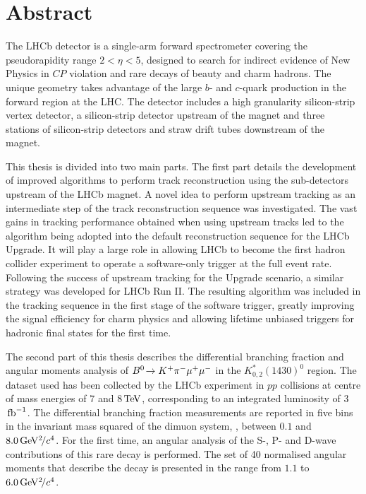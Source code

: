 \section*{Abstract}

The LHCb detector is a single-arm forward spectrometer covering the pseudorapidity range $2 < \eta < 5$, designed to search for indirect evidence of New Physics in $C\!P$ violation and rare decays of beauty and charm hadrons. The unique geometry takes advantage of the large $b$- and $c$-quark production in the forward region at the LHC. The detector includes a high granularity silicon-strip vertex detector, a silicon-strip detector upstream of the magnet and three stations of silicon-strip detectors and straw drift tubes downstream of the magnet.

This thesis is divided into two main parts. The first part details the development of improved algorithms to perform track reconstruction using the sub-detectors upstream of the LHCb magnet. A novel idea to perform upstream tracking as an intermediate step of the track reconstruction sequence was investigated. The vast gains in tracking performance obtained when using upstream tracks led to the algorithm being adopted into the default reconstruction sequence for the LHCb Upgrade. It will play a large role in allowing LHCb to become the first hadron collider experiment to operate a software-only trigger at the full event rate. Following the success of upstream tracking for the Upgrade scenario, a similar strategy was developed for LHCb Run II. The resulting algorithm was included in the tracking sequence in the first stage of the software trigger, greatly improving the signal efficiency for charm physics and allowing lifetime unbiased triggers for hadronic final states for the first time.

The second part of this thesis describes the differential branching fraction and angular moments analysis of ${B}^0\!\rightarrow K^{+}\pi^{-}\mu^{+}\mu^{-}$ in the $K^{*}_{0,2}(1430)^{0}$ region. The dataset used has been collected by the LHCb experiment in $pp$ collisions at centre of mass energies of 7 and 8${\mathrm{\,Te\kern -0.1em V}}$, corresponding to an integrated luminosity of 3$\mbox{\,fb}^{-1}$. The differential branching fraction measurements are reported in five bins in the invariant mass squared of the dimuon system, \qsq, between $0.1$ and $8.0{\mathrm{\,Ge\kern -0.1em V^2\!/}c^4}$. For the first time, an angular analysis of the S-, P- and D-wave contributions of this rare decay is performed. The set of 40 normalised angular moments that describe the decay is presented in the \qsq range from $1.1$ to $6.0{\mathrm{\,Ge\kern -0.1em V^2\!/}c^4}$.